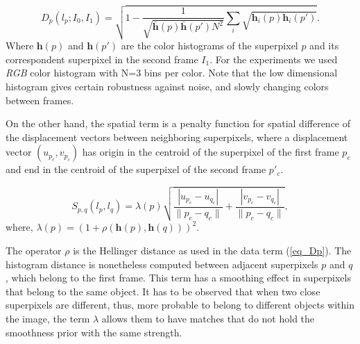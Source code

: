 \begin{equation}
D_p(l_p;I_0,I_1) = \sqrt{ 1 - \frac{1}{\sqrt{\bar{ \boldsymbol{h} }(p) \bar{ \boldsymbol{h} }(p')N^2} } \sum_{i}\sqrt{ \boldsymbol{h}_{i}(p) \boldsymbol{h}_{i}(p')} }.
\label{eq_Dp}
\end{equation}
Where $\textbf{h}(p)$ and $\textbf{h}(p')$ are the color histograms of the superpixel $p$ and its correspondent superpixel in the
second frame $I_1$. For the experiments we used {\it RGB} color histogram with N=3 bins per color.
Note that the low dimensional histogram gives certain robustness against noise,
and slowly changing colors between frames. 

On the other hand, the spatial term is a penalty function for spatial difference of the displacement vectors between neighboring superpixels, where a displacement vector 
$(u_{p_c},v_{p_c})$ has origin 
in the centroid of the superpixel of the first frame $p_c$ and
end in the centroid of the superpixel of the second frame $p'_c$.

\begin{equation}
S_{p,q}(l_p, l_q) = \lambda(p)
  \sqrt{\frac{|u_{p_c}-u_{q_c}|}{\|p_c-q_c\|}+ \frac{|v_{p_c}-v_{q_c}|}{\|p_c-q_c\|}},
\label{eq_Spq}
\end{equation}
 where, $ \lambda(p) = (1 + \rho(\boldsymbol{h}(p),\boldsymbol{h}(q)))^2 $.

The operator $\rho$ is the Hellinger distance as used in the
data term (\ref{eq_Dp}). The histogram distance is nonetheless computed between adjacent superpixels $p$ and $q$, 
which belong to the first frame.
This term has a smoothing effect in superpixels that belong to the
same object. It has to be observed that when two close superpixels are different, thus, more probable to
belong to different objects within the image, the term $\lambda$ allows them to have
matches that do not hold the smoothness prior with the same strength. 

